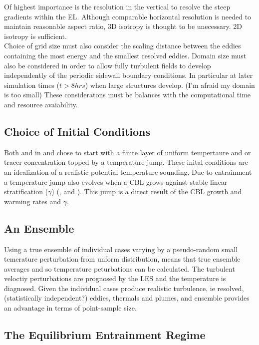 Of highest importance is the resolution in the vertical to resolve the steep gradients within the \acs{EL}. 
Although comparable horizontal resolution is needed to maintain reasonable aspect ratio, 3D isotropy is thought to be unecessary.
2D isotropy is sufficient.\\

Choice of grid size must also consider the scaling distance between the eddies containing the most energy
and the smallest resolved eddies.  Domain size must also be considered in order to allow fully turbulent fields to develop independently of the periodic sidewall 
boundary conditions. In particular at later simulation times ($t > 8hrs$) when large structures develop.  
(I'm afraid my domain is too small) These consideratons must be balances with the computational time and 
resource avaiability.\\

\subsection{Choice of Initial Conditions}

Both \citeauthor{SullMoengStev} and \citeauthor{BrooksFowler1} in \cite{SullMoengStev} and \cite{BrooksFowler1} chose to
start with a finite layer of uniform tempertaure and or tracer concentration topped by a temperature jump.  These inital conditions
are an idealization of a realistic potential temperature sounding.  Due to entrainment a temperature jump
also evolves when a \acs{CBL} grows against stable linear stratification ($\gamma$) (\cite{Turner86}, \cite{FedConzMir04} and \cite{GarciaMellado}).
This jump is a direct result of the \acs{CBL} growth and warming rates and $\gamma$.
 
\subsection{An Ensemble}

Using a true ensemble of individual cases varying by a pseudo-random small temerature perturbation from unform distribution,
means that true ensemble averages and so temperature peturbations can be calculated.  The turbulent veloctiy perturbations are 
prognosed by the \acs{LES} and the temperature is diagnosed.  Given the individual cases produce realistic turbulence,
 ie resolved, (statistically independent?) eddies, thermals and plumes, and ensemble provides an advantage in terms
 of point-sample size.       

\subsection{The Equilibrium Entrainment Regime}

